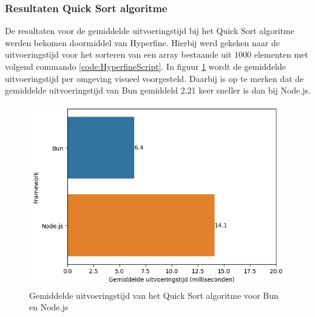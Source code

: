 \subsubsection{Resultaten  Quick Sort algoritme}
De resultaten voor de gemiddelde uitvoeringstijd bij het Quick Sort algoritme werden bekomen doormiddel van Hyperfine.
Hierbij werd gekeken naar de uitvoeringstijd voor het sorteren van een array bestaande uit 1000 elementen met volgend commando \ref{code:HyperfineScript}.
In figuur \ref{fig:uitvoeringstijdscript} wordt de gemiddelde uitvoeringstijd per omgeving visueel voorgesteld. 
Daarbij is op te merken dat de gemiddelde uitvoeringstijd van Bun gemiddeld 2.21 keer sneller is dan bij Node.js.
\begin{figure}[H]
  \centering
  \includegraphics{graphics/scriptuitvoeringstijd.png}
  \caption{\label{fig:uitvoeringstijdscript}Gemiddelde uitvoeringstijd van het Quick Sort algoritme voor Bun en Node.js}
\end{figure}